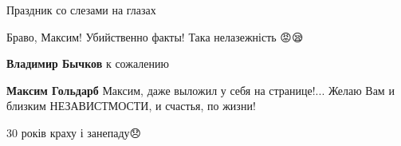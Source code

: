 \begin{itemize}
Праздник со слезами на глазах

 
Браво, Максим! Убийственно факты! Така нелазежність 😡😪

\begin{itemize}
 
\textbf{Владимир Бычков} к сожалению

 
\textbf{Максим Гольдарб} Максим, даже выложил у себя на странице!... Желаю Вам и близким НЕЗАВИСТМОСТИ, и счастья, по жизни!
\end{itemize}

 
30 років краху і занепаду😞

\end{itemize}

